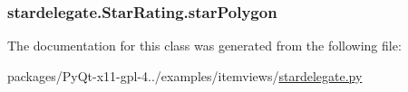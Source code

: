 \subsubsection[{star\+Polygon}]{\setlength{\rightskip}{0pt plus 5cm}stardelegate.\+Star\+Rating.\+star\+Polygon}\label{classstardelegate_1_1StarRating_ab32e61d2e9fe0e17108a0706ee78ca2f}


The documentation for this class was generated from the following file\+:\begin{DoxyCompactItemize}
\item 
packages/\+Py\+Qt-\/x11-\/gpl-\/4../examples/itemviews/\hyperlink{stardelegate_8py}{stardelegate.\+py}\end{DoxyCompactItemize}
